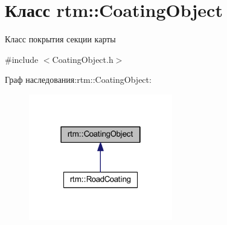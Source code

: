 \hypertarget{classrtm_1_1_coating_object}{}\section{Класс rtm\+:\+:Coating\+Object}
\label{classrtm_1_1_coating_object}


Класс покрытия секции карты  




{\ttfamily \#include $<$Coating\+Object.\+h$>$}



Граф наследования\+:rtm\+:\+:Coating\+Object\+:
\nopagebreak
\begin{figure}[H]
\begin{center}
\leavevmode
\includegraphics[width=178pt]{classrtm_1_1_coating_object__inherit__graph}
\end{center}
\end{figure}

